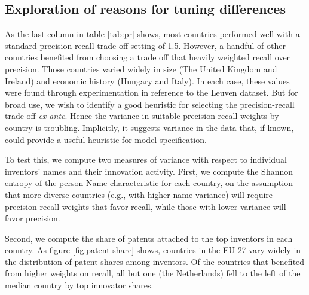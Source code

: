 \documentclass[11pt]{article}
\begin{document}
\subsection{Exploration of reasons for tuning differences}
\label{sec:expl-reas-tuning}

As the last column in table \ref{tab:pr} shows, most countries
performed well with a standard precision-recall trade off setting of
1.5. However, a handful of other countries benefited from choosing a
trade off that heavily weighted recall over precision. Those countries
varied widely in size (The United Kingdom and Ireland) and economic
history (Hungary and Italy). In each case, these values were found
through experimentation in reference to the Leuven dataset. But for
broad use, we wish to identify a good heuristic for selecting the
precision-recall trade off \textit{ex ante}. Hence the variance in
suitable precision-recall weights by country is troubling. Implicitly,
it suggests variance in the data that, if known, could provide a
useful heuristic for model specification.

To test this, we compute two measures of variance with respect to
individual inventors' names and their innovation activity. First, we
compute the Shannon entropy of the person Name
characteristic for each country, on the assumption that more diverse
countries (e.g., with higher name variance) will require
precision-recall weights that favor recall, while those with lower
variance will favor precision. 

Second, we compute the share of patents
attached to the top inventors in each country. As figure
\ref{fig:patent-share} shows, countries in the EU-27 vary widely in
the distribution of patent shares among inventors. Of the countries
that benefited from higher weights on recall, all but one (the Netherlands) fell to the
left of the median country by top innovator shares.




\end{document}
